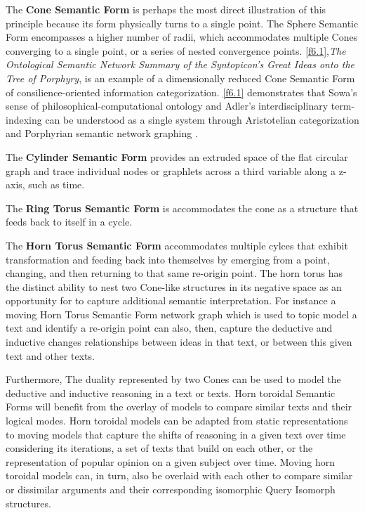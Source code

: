 The \textbf{Cone Semantic Form} is perhaps the most direct illustration of this principle because its form physically turns to a single point. The Sphere Semantic Form encompasses a higher number of radii, which accommodates multiple Cones converging to a single point, or a series of nested convergence points. \autoref{f6.1},\textit{The Ontological Semantic Network Summary of the Syntopicon’s Great Ideas onto the Tree of Porphyry}, is an example of a dimensionally reduced Cone Semantic Form of consilience-oriented information categorization. \autoref{f6.1} demonstrates that Sowa's sense of philosophical-computational ontology and Adler's interdisciplinary term-indexing \citep{adler_great_1952-2} can be understood as a single system through Aristotelian categorization and Porphyrian semantic network graphing \citep[p. 4]{sowa_knowledge_2000}. 
   


The \textbf{Cylinder Semantic Form} provides an extruded space of the flat circular graph and trace individual nodes or graphlets across a third variable along a z-axis, such as time.

The \textbf{Ring Torus Semantic Form} is accommodates the cone as a structure that feeds back to itself in a cycle.

The \textbf{Horn Torus Semantic Form} accommodates multiple cylces that exhibit transformation and feeding back into themselves by emerging from a point, changing, and then returning to that same re-origin point. The horn torus has the distinct ability to nest two Cone-like structures in its negative space as an opportunity for to capture additional semantic interpretation. For instance a moving Horn Torus Semantic Form network graph which is used to topic model a text and identify a re-origin point can also, then, capture the deductive and inductive changes relationships between ideas in that text, or between this given text and other texts.

Furthermore, The duality represented by two Cones can be used to model the deductive and inductive reasoning in a text or texts. Horn toroidal Semantic Forms will benefit from the overlay of models to compare similar texts and their logical modes. Horn toroidal models can be adapted from static representations to moving models that capture the shifts of reasoning in a given text over time considering its iterations, a set of texts that build on each other, or the representation of popular opinion on a given subject over time. Moving horn toroidal models can, in turn, also be overlaid with each other to compare similar or dissimilar arguments and their corresponding isomorphic Query Isomorph structures.



